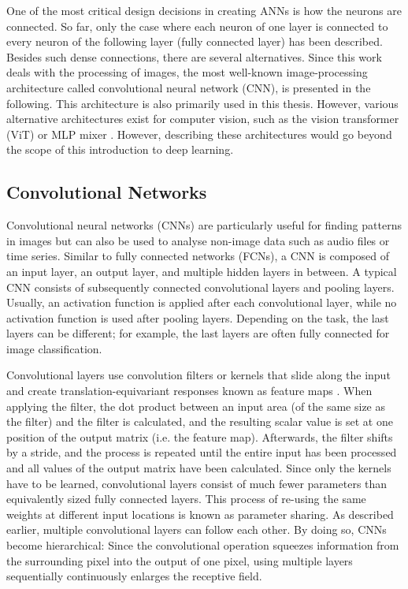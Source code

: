 One of the most critical design decisions in creating ANNs is how the neurons are connected.
So far, only the case where each neuron of one layer is connected to every neuron of the following layer (fully connected layer) has been described. 
Besides such dense connections, there are several alternatives.
Since this work deals with the processing of images, the most well-known image-processing architecture called convolutional neural network (CNN), is presented in the following. This architecture is also primarily used in this thesis. However, various alternative architectures exist for computer vision, such as the vision transformer (ViT)  or MLP mixer . However, describing these architectures would go beyond the scope of this introduction to deep learning.

\subsection{Convolutional Networks}
Convolutional neural networks (CNNs) are particularly useful for finding patterns in images but can also be used to analyse non-image data such as audio files or time series.
Similar to fully connected networks (FCNs), a CNN is composed of an input layer, an output layer, and multiple hidden layers in between.
A typical CNN consists of subsequently connected convolutional layers and pooling layers.
Usually, an activation function is applied after each convolutional layer, while no activation function is used after pooling layers.
Depending on the task, the last layers can be different; for example, the last layers are often fully connected for image classification.

Convolutional layers use convolution filters or kernels that slide along the input and create translation-equivariant  responses known as feature maps .
When applying the filter, the dot product between an input area (of the same size as the filter) and the filter is calculated, and the resulting scalar value is set at one position of the output matrix (i.e. the feature map).
Afterwards, the filter shifts by a stride, and the process is repeated until the entire input has been processed and all values of the output matrix have been calculated.
Since only the kernels have to be learned, convolutional layers consist of much fewer parameters than equivalently sized fully connected layers.
This process of re-using the same weights at different input locations is known as parameter sharing.
As described earlier, multiple convolutional layers can follow each other.
By doing so, CNNs become hierarchical: Since the convolutional operation squeezes information from the surrounding pixel into the output of one pixel, using multiple layers sequentially continuously enlarges the receptive field.

